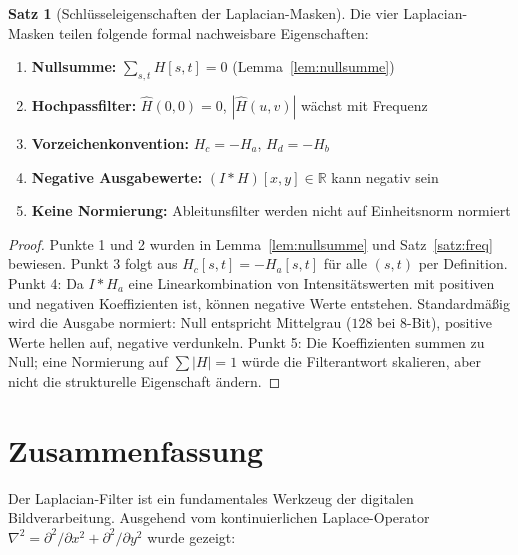 ﻿\documentclass[a4paper,12pt]{article}
\theoremstyle{definition}
\newtheorem{satz}{Satz}
\begin{document}
\begin{satz}[Schlüsseleigenschaften der Laplacian-Masken]
Die vier Laplacian-Masken teilen folgende formal nachweisbare Eigenschaften:
\begin{enumerate}
    \item \textbf{Nullsumme:} $\sum_{s,t} H[s,t] = 0$ (Lemma~\ref{lem:nullsumme})
    \item \textbf{Hochpassfilter:} $\hat{H}(0,0) = 0$, $|\hat{H}(u,v)|$ wächst mit Frequenz
    \item \textbf{Vorzeichenkonvention:} $H_c = -H_a$, $H_d = -H_b$
    \item \textbf{Negative Ausgabewerte:} $(I * H)[x,y] \in \mathbb{R}$ kann negativ sein
    \item \textbf{Keine Normierung:} Ableitunsfilter werden nicht auf Einheitsnorm normiert
\end{enumerate}
\end{satz}

\begin{proof}
    Punkte 1 und 2 wurden in Lemma~\ref{lem:nullsumme} und Satz~\ref{satz:freq} bewiesen.
    Punkt 3 folgt aus $H_c[s,t] = -H_a[s,t]$ für alle $(s,t)$ per Definition.
    Punkt 4: Da $I * H_a$ eine Linearkombination von Intensitätswerten mit positiven und
    negativen Koeffizienten ist, können negative Werte entstehen. Standardmäßig wird die
    Ausgabe normiert: Null entspricht Mittelgrau ($128$ bei 8-Bit), positive Werte hellen auf,
    negative verdunkeln.
    Punkt 5: Die Koeffizienten summen zu Null; eine Normierung auf $\sum|H| = 1$ würde die
    Filterantwort skalieren, aber nicht die strukturelle Eigenschaft ändern. \qedhere
\end{proof}

\section{Zusammenfassung}

Der Laplacian-Filter ist ein fundamentales Werkzeug der digitalen Bildverarbeitung. Ausgehend
vom kontinuierlichen Laplace-Operator $\nabla^2 = \partial^2/\partial x^2 + \partial^2/\partial y^2$
wurde gezeigt:
\end{document}
